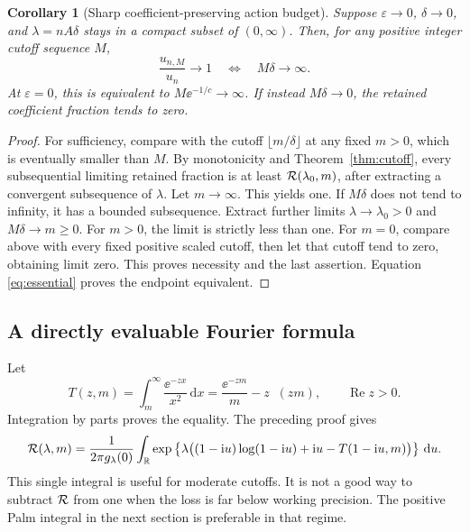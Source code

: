 \documentclass[11pt,a4paper]{article}
\numberwithin{equation}{section}
\newtheorem{corollary}[theorem]{Corollary}
\theoremstyle{definition}
\theoremstyle{remark}
\DeclareMathOperator{\Rea}{Re}
\DeclareMathOperator{\Eone}{E_1}
\newcommand{\R}{\mathbb R}\newcommand{\C}{\mathbb C}
\newcommand{\dd}{\,\mathrm d}\newcommand{\ii}{\mathrm i}
\newcommand{\ep}{\varepsilon}\newcommand{\la}{\lambda}
\begin{document}
\begin{corollary}[Sharp coefficient-preserving action budget]
\label{cor:budget}
Suppose \(\ep\to0\), \(\delta\to0\), and
\(\la=nA\delta\) stays in a compact subset of \((0,\infty)\).
Then, for any positive integer cutoff sequence \(M\),
\begin{equation}\label{eq:budget-iff}
 \frac{u_{n,M}}{u_n}\longrightarrow1
 \quad\Longleftrightarrow\quad M\delta\longrightarrow\infty.
\end{equation}
At \(\ep=0\), this is equivalent to \(M\ee^{-1/c}\to\infty\).
If instead \(M\delta\to0\), the retained coefficient fraction tends
to zero.
\end{corollary}
\begin{proof}
For sufficiency, compare with the cutoff
\(\lfloor m/\delta\rfloor\) at any fixed \(m>0\), which is eventually
smaller than \(M\). By monotonicity and Theorem~\ref{thm:cutoff}, every
subsequential limiting retained fraction is at least
\(\RR(\la_0,m)\), after extracting a convergent subsequence of
\(\la\). Let \(m\to\infty\). This yields one.
If \(M\delta\) does not tend to infinity, it has a bounded subsequence.
Extract further limits \(\la\to\la_0>0\) and \(M\delta\to m\ge0\).
For \(m>0\), the limit is strictly less than one. For \(m=0\), compare
above with every fixed positive scaled cutoff, then let that cutoff
tend to zero, obtaining limit zero. This proves necessity and the last
assertion. Equation \eqref{eq:essential} proves the endpoint equivalent.
\end{proof}

\subsection{A directly evaluable Fourier formula}
Let
\begin{equation}\label{eq:T}
 T(z,m)=\int_m^\infty\frac{\ee^{-zx}}{x^2}\dd x
       =\frac{\ee^{-zm}}m-z\Eone(zm),\qquad \Rea z>0.
\end{equation}
Integration by parts proves the equality. The preceding proof gives
\begin{equation}\label{eq:R-Fourier}
 \RR(\la,m)=\frac1{2\pi g_\la(0)}\int_\R
 \exp\left\{\la\bigl((1-\ii u)\log(1-\ii u)+\ii u
                         -T(1-\ii u,m)\bigr)\right\}\dd u.
\end{equation}
This single integral is useful for moderate cutoffs. It is not a good
way to subtract \(\mathcal R\) from one when the loss is far below working
precision. The positive Palm integral in the next section is preferable
in that regime.
\end{document}
